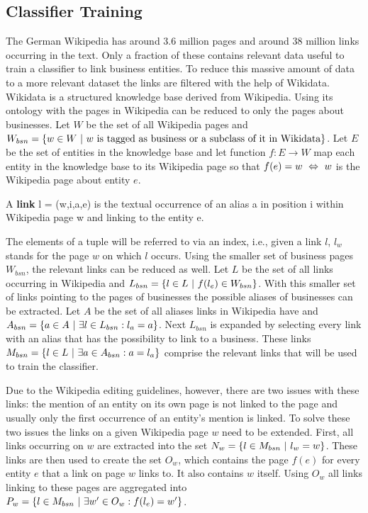 \subsection{Classifier Training}
The German Wikipedia has around 3.6 million pages and around 38 million links occurring in the text. Only a fraction of these contains relevant data useful to train a classifier to link business entities. To reduce this massive amount of data to a more relevant dataset the links are filtered with the help of Wikidata. Wikidata is a structured knowledge base derived from Wikipedia. Using its ontology with the pages in Wikipedia can be reduced to only the pages about businesses. Let $W$ be the set of all Wikipedia pages and $W_{bsn} = \{ w \in W {\mbox{ }|\mbox{ }} w \text{ is tagged as business or a subclass of it in Wikidata} \}$. Let $E$ be the set of entities in the knowledge base and let function $f: E \to W$ map each entity in the knowledge base to its Wikipedia page so that $f(e) = w {\mbox{ }\Leftrightarrow\mbox{ }} w$ is the Wikipedia page about entity $e$.
\begin{definition}
A \textbf{link} l = (w,i,a,e) is the textual occurrence of an alias a in position i within Wikipedia page w and linking to the entity e.
\label{link}
\end{definition}
The elements of a tuple will be referred to via an index, i.e., given a link $l$, $l_w$ stands for the page $w$ on which $l$ occurs. Using the smaller set of business pages $W_{bsn}$, the relevant links can be reduced as well. Let $L$ be the set of all links occurring in Wikipedia and $L_{bsn} = \{ l \in L {\mbox{ }|\mbox{ }} f(l_e) \in W_{bsn} \}$. With this smaller set of links pointing to the pages of businesses the possible aliases of businesses can be extracted. Let $A$ be the set of all aliases links in Wikipedia have and $A_{bsn} = \{ a \in A {\mbox{ }|\mbox{ }} \exists l \in L_{bsn}: l_a = a \}$. Next $L_{bsn}$ is expanded by selecting every link with an alias that has the possibility to link to a business. These links $M_{bsn} = \{ l \in L {\mbox{ }|\mbox{ }} \exists a \in A_{bsn}: a = l_a \}$ comprise the relevant links that will be used to train the classifier.\par
Due to the Wikipedia editing guidelines, however, there are two issues with these links: the mention of an entity on its own page is not linked to the page and usually only the first occurrence of an entity's mention is linked. To solve these two issues the links on a given Wikipedia page $w$ need to be extended. First, all links occurring on $w$ are extracted into the set $N_w = \{ l \in M_{bsn} {\mbox{ }|\mbox{ }} l_w = w\}$. These links are then used to create the set $O_w$, which contains the page $f(e)$ for every entity $e$ that a link on page $w$ links to. It also contains $w$ itself. Using $O_w$ all links linking to these pages are aggregated into $P_w = \{ l \in M_{bsn} {\mbox{ }|\mbox{ }} \exists w' \in O_w: f(l_e) = w' \}$.\par
